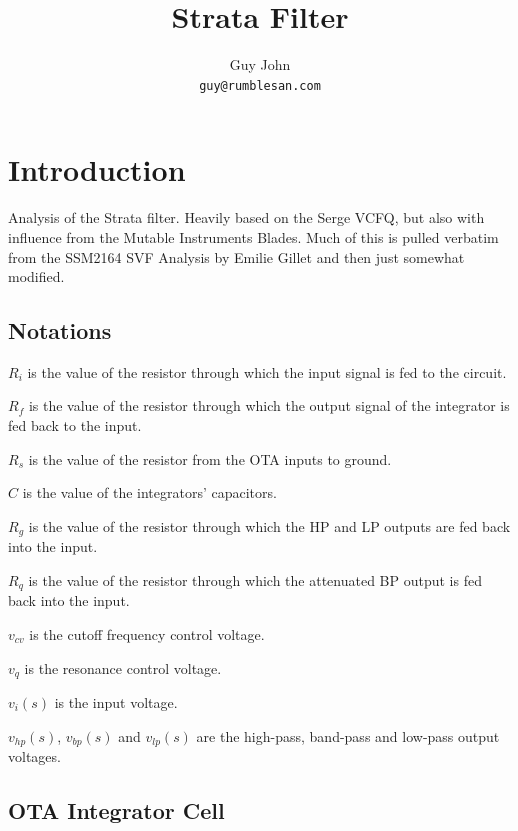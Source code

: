 \documentclass{article}
\title{Strata Filter}
\author{Guy John \\ \texttt{guy@rumblesan.com}}
\begin{document}
\maketitle

\section{Introduction}
Analysis of the Strata filter. Heavily based on the Serge VCFQ, but also with influence from the Mutable Instruments Blades. Much of this is pulled verbatim from the SSM2164 SVF Analysis by Emilie Gillet and then just somewhat modified.

\newpage

\subsection{Notations}

\begin{description}
\item $R_i$ is the value of the resistor through which the input signal is fed to the circuit.
\item $R_f$ is the value of the resistor through which the output signal of the integrator is fed back to the input.
\item $R_s$ is the value of the resistor from the OTA inputs to ground.
\item $C$ is the value of the integrators' capacitors.
\item $R_g$ is the value of the resistor through which the HP and LP outputs are fed back into the input.
\item $R_q$ is the value of the resistor through which the attenuated BP output is fed back into the input.
\item $v_{cv}$ is the cutoff frequency control voltage.
\item $v_q$ is the resonance control voltage.
\item $v_i(s)$ is the input voltage.
\item $v_{hp}(s)$, $v_{bp}(s)$ and $v_{lp}(s)$ are the high-pass, band-pass and low-pass output voltages.
\end{description}

\subsection{OTA Integrator Cell}
\end{document}
